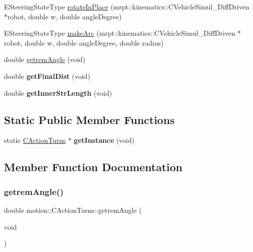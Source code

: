 \begin{DoxyCompactItemize}
E\+Steering\+State\+Type \mbox{\hyperlink{classmotion_1_1CActionTurns_a7da7158584918b160511ab07c01178b7}{rotate\+In\+Place}} (mrpt\+::kinematics\+::\+C\+Vehicle\+Simul\+\_\+\+Diff\+Driven $\ast$robot, double w, double angle\+Degree)
\item 
E\+Steering\+State\+Type \mbox{\hyperlink{classmotion_1_1CActionTurns_ae56d545164cc1931e3a86c1d5a4651b2}{make\+Arc}} (mrpt\+::kinematics\+::\+C\+Vehicle\+Simul\+\_\+\+Diff\+Driven $\ast$robot, double w, double angle\+Degree, double radius)
\item 
double \mbox{\hyperlink{classmotion_1_1CActionTurns_aed85b8c64e21ca7ccc39a2dd52a47584}{getrem\+Angle}} (void)
\item 
\mbox{\label{classmotion_1_1CActionTurns_a98b667a68a21f8963e05f7ac4791fadd}} 
double {\bfseries get\+Final\+Dist} (void)
\item 
\mbox{\label{classmotion_1_1CActionTurns_ac36cd57a8fa3a71aa1a213ff79210a7e}} 
double {\bfseries get\+Inner\+Str\+Length} (void)
\end{DoxyCompactItemize}
\subsection*{Static Public Member Functions}
\begin{DoxyCompactItemize}
\item 
\mbox{\label{classmotion_1_1CActionTurns_ab5d09b31f4ccdfa32e8cb85356a1aae1}} 
static \mbox{\hyperlink{classmotion_1_1CActionTurns}{C\+Action\+Turns}} $\ast$ {\bfseries get\+Instance} (void)
\end{DoxyCompactItemize}


\subsection{Member Function Documentation}
\mbox{\label{classmotion_1_1CActionTurns_aed85b8c64e21ca7ccc39a2dd52a47584}} 
\subsubsection{\texorpdfstring{getrem\+Angle()}{getremAngle()}}
{\footnotesize\ttfamily double motion\+::\+C\+Action\+Turns\+::getrem\+Angle (\begin{DoxyParamCaption}\item[{void}]{ }\end{DoxyParamCaption})\hspace{0.3cm}{\ttfamily [inline]}}

